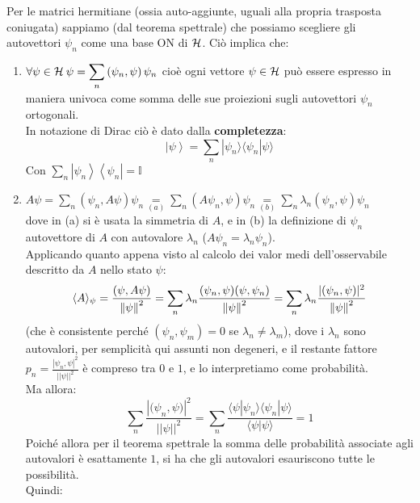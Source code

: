\documentclass[../../FisicaTeorica.tex]{subfiles}
\begin{document}
Per le matrici hermitiane (ossia auto-aggiunte, uguali alla propria trasposta coniugata) sappiamo (dal teorema spettrale) che possiamo scegliere gli autovettori $\psi_n$ come una base ON di $\mathcal{H}$. Ciò implica che:
\begin{enumerate}
    \item $\displaystyle \forall \psi \in \mathcal{H} \> \psi = \sum_{n}{\left(\psi_n, \psi\right)\psi_n}$
    cioè ogni vettore $\psi \in \mathcal{H}$ può essere espresso in maniera univoca come somma delle sue proiezioni sugli autovettori $\psi_n$ ortogonali.\\
    In notazione di Dirac ciò è dato dalla \textbf{completezza}:
    \[
	\left|\psi\right\rangle=\sum_{n}{|\psi_n\rangle \langle\psi_n|\psi\rangle }
	\]
	Con $\sum_{n}{\left|\psi_n\right\rangle\left\langle\psi_n\right|=\mathbb{I}}$
	\item $\displaystyle A\psi = \sum_{n}{\left(\psi_n, A\psi\right)\psi_n \underset{(a)}{=} \sum_{n}{\left(A\psi_n, \psi\right)\psi_n \underset{(b)}{=}\sum_{n}{\lambda_n\left(\psi_n, \psi\right)\psi_n}}}$\\
	dove in (a) si è usata la simmetria di $A$, e in (b) la definizione di $\psi_n$ autovettore di $A$ con autovalore $\lambda_n$ ($A\psi_n = \lambda_n \psi_n$).\\
	Applicando quanto appena visto al calcolo dei valor medi dell'osservabile descritto da $A$ nello stato $\psi$:
	\[
	\langle A \rangle_\psi = \frac{(\psi,A\psi)}{\left\lVert\psi\right\rVert^2} = \sum_n \lambda_n \frac{(\psi_n, \psi)(\psi, \psi_n)}{\left\lVert\psi\right\rVert^2} = \sum_n \lambda_n \frac{|(\psi_n, \psi)|^2}{\left\lVert\psi\right\rVert^2}
	\]
	(che è consistente perché $\left(\psi_n, \psi_m\right)=0$ se $\lambda_n\neq \lambda_m$), dove i $\lambda_n$ sono autovalori, per semplicità qui assunti non degeneri, e il restante fattore $\displaystyle p_n = \frac{\left|\psi_n,\psi\right|^2}{\left|\left|\psi\right|\right|^2}$ è compreso tra $0$ e $1$, e lo interpretiamo come probabilità.\\
	Ma allora:
	\[
	\sum_{n}{\frac{\left|{(\psi}_n, \psi)\right|^2}{\left|\left|\psi\right|\right|^2}=\sum_{n}\frac{\langle\psi|\psi_n\rangle \langle\psi_n|\psi\rangle }{\langle\psi|\psi\rangle }=1 }
	\]
	Poiché allora per il teorema spettrale la somma delle probabilità associate agli autovalori è esattamente $1$, si ha che gli autovalori esauriscono tutte le possibilità.\\
	Quindi:
	\begin{align*}

\end{align*}
\end{enumerate}
\end{document}
